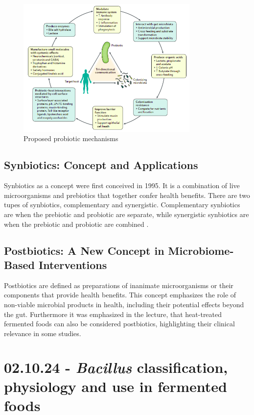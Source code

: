 \begin{figure}[h]
    \centering
    \includegraphics[width=0.8\textwidth]{Figures/probiotic_mechanisms.png}
    \caption{Proposed probiotic mechanisms \cite*{fig-pro_mech}}
    \label{fig:ProbioticMechanisms}
\end{figure}

\subsection{Synbiotics: Concept and Applications}
Synbiotics as a concept were first conceived in 1995. It is a combination of live microorganisms and prebiotics that together confer health benefits. There are two tupes of synbiotics, complementary and synergistic. Complementary synbiotics are when the prebiotic and probiotic are separate, while synergistic synbiotics are when the prebiotic and probiotic are combined \cite*{L6-Yeasts}.

\subsection{Postbiotics: A New Concept in Microbiome-Based Interventions}
Postbiotics are defined as preparations of inanimate microorganisms or their components that provide health benefits. This concept emphasizes the role of non-viable microbial products in health, including their potential effects beyond the gut. Furthermore it was emphasized in the lecture, that heat-treated fermented foods can also be considered postbiotics, highlighting their clinical relevance in some studies.

\section{02.10.24 - \textit{Bacillus} classification, physiology and use in fermented foods}

